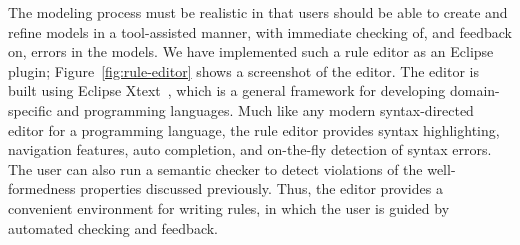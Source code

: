 The modeling process must be realistic in that users should be able to create
and refine models in a tool-assisted manner, with immediate checking of, and
feedback on, errors in the models.  We have implemented such a rule editor as an
Eclipse plugin; Figure~\ref{fig:rule-editor} shows a screenshot of the
editor. The editor is built using Eclipse Xtext~\cite{xtext}, which is a general
framework for developing domain-specific and programming languages. Much like
any modern syntax-directed editor for a programming language, the rule editor
provides syntax highlighting, navigation features, auto completion, and
on-the-fly detection of syntax errors.  The user can also run a semantic checker
to detect violations of the well-formedness properties discussed
previously. Thus, the editor provides a convenient environment for writing
rules, in which the user is guided by automated checking and feedback.
